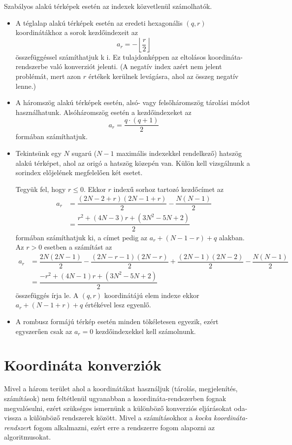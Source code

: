 Szabályos alakú térképek esetén az indexek közvetlenül számolhatók.
\begin{itemize}
\item A téglalap alakú térképek esetén az eredeti hexagonális $(q, r)$ koordinátákhoz a sorok kezdőindexeit az
$$
a_r = - \left\lfloor \dfrac{r}{2} \right\rfloor
$$
összefüggéssel számíthatjuk k
i. Ez tulajdonképpen az eltolásos koordináta-rend\-szer\-be való konverziót jelenti. (A negatív index azért nem jelent problémát, mert azon $r$ értékek kerülnek levágásra, ahol az összeg negatív lenne.)
\item A háromszög alakú térképek esetén, alsó- vagy felsőháromszög tárolási módot használhatunk. Alsóháromszög esetén a kezdőindexeket az
$$
a_r = \dfrac{q \cdot (q + 1)}{2}
$$
formában számíthatjuk.
\item Tekintsünk egy $N$ sugarú ($N - 1$ maximális indexekkel rendelkező) hatszög alakú térképet, ahol az origó a hatszög közepén van. Külön kell vizsgálnunk a sorindex előjelének megfelelően két esetet.

Tegyük fel, hogy $r \leq 0$. Ekkor $r$ indexű sorhoz tartozó kezdőcímet az
\begin{align*}
a_r &=
\dfrac{
(2N - 2 + r)(2N - 1 + r)
}{2}
-
\dfrac{
N(N - 1)
}{2} \\
&=
\dfrac{r^2 + (4N - 3)r + (3N^2 - 5N + 2)}{2}
\end{align*}
formában számíthatjuk ki, a címet pedig az $a_r + (N - 1 -r) + q$ alakban.
Az $r > 0$ esetben a számítást az
\begin{align*}
a_r &=
\dfrac{2N(2N - 1)}{2} -
\dfrac{(2N - r - 1)(2N - r)}{2} +
\dfrac{(2N - 1)(2N - 2)}{2} -
\dfrac{N(N - 1)}{2} \\
&=
\dfrac{-r^2 + (4N - 1)r + (3N^2 - 5N + 2)}
{2}
\end{align*}
összefüggés írja le. A $(q, r)$ koordinátájú elem indexe ekkor $a_r + (N - 1 + r) + q$ értékével lesz egyenlő.
\item A rombusz formájú térkép esetén minden tökéletesen egyezik, ezért egyszerűen csak az $a_r = 0$ kezdőindexekkel kell számolnunk.
\end{itemize}

\section{Koordináta konverziók}

Mivel a három terület ahol a koordinátákat használjuk (tárolás, megjelenítés, számítások) nem feltétlenül ugyanabban a koordináta-rendszerben fognak megvalósulni, ezért szükséges ismernünk a különböző konverziós eljárásokat oda-vissza a különböző rendszerek között. Mivel a számításokhoz a \textit{kocka koordináta-rendszer}t fogom alkalmazni, ezért erre a rendszerre fogom alapozni az algoritmusokat.

